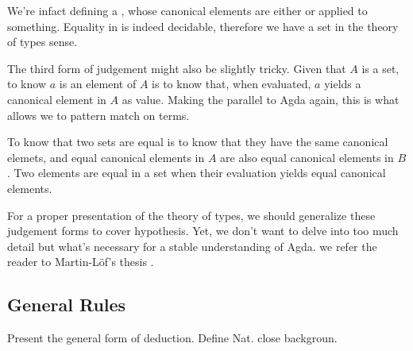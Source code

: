 
We're infact defining a , whose canonical elements are either  or
 applied to something. Equality in  is indeed decidable, therefore we have a set
in the theory of types sense.

The third form of judgement might also be slightly tricky. Given that $A$ is a set, 
to know $a$ is an element of $A$ is to know that, when evaluated, $a$ yields a canonical element in $A$
as value. Making the parallel to Agda again, this is what allows we to pattern match on terms.

To know that two sets are equal is to know that they have the same canonical elemets, and
equal canonical elements in $A$ are also equal canonical elements in $B$. Two elements are
equal in a set when their evaluation yields equal canonical elements.

For a proper presentation of the theory of types, we should generalize these judgement forms
to cover hypothesis. Yet, we don't want to delve into too much detail but what's necessary for 
a stable understanding of Agda. we refer the reader to Martin-L\"{o}f's thesis \cite{lof84,lof85}.

\subsection{General Rules}

\begin{TODO}
  \item Present the general form of deduction. Define Nat. close backgroun.
\end{TODO}



